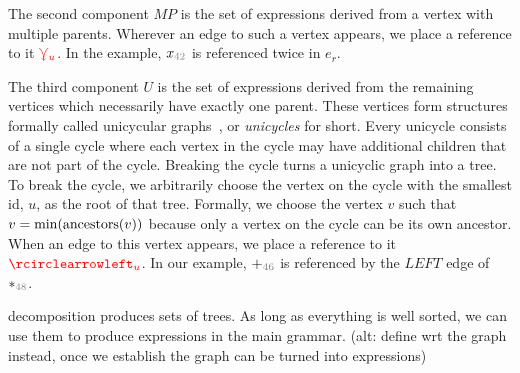 
The second component $MP$ is the set of expressions derived from a vertex with multiple parents.
Wherever an edge to such a vertex appears, we place a reference to it $\textcolor{red}{\curlyveedownarrow_{u}}$.
In the example, $x_{\id{42}}$ is referenced twice in $e_r$.

The third component $U$ is the set of expressions derived from the remaining vertices which necessarily have exactly one parent.
These vertices form structures formally called unicycular graphs~\citep{DBLP:journals/algorithmica/KruskalRS90}, or \emph{unicycles} for short.
Every unicycle consists of a single cycle where each vertex in the cycle may have additional children that are not part of the cycle.
Breaking the cycle turns a unicyclic graph into a tree.
To break the cycle, we arbitrarily choose the vertex on the cycle with the smallest id, $u$, as the root of that tree.
Formally, we choose the vertex $v$ such that $v = \min(\operatorname{\text{ancestors}}(v))$ because
only a vertex on the cycle can be its own ancestor.
When an edge to this vertex appears, we place a reference to it $\cycleVertex{u}$.
In our example, ${+}_{\id{46}}$ is referenced by the $LEFT$ edge of ${*}_{\id{48}}$.


decomposition produces sets of trees. As long as everything is well sorted, we
can use them to produce expressions in the main grammar. (alt: define wrt the
graph instead, once we establish the graph can be turned into expressions)

